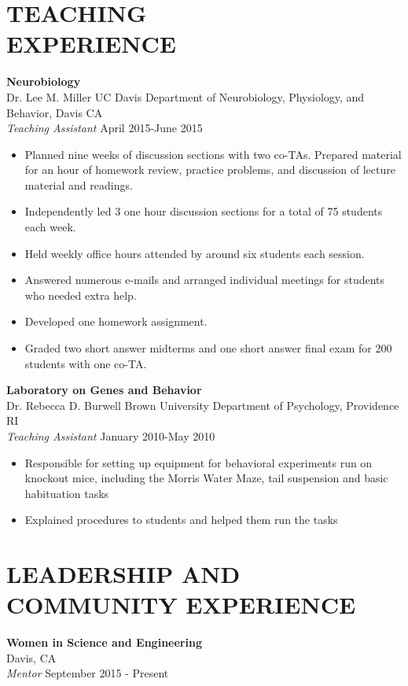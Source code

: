 \documentclass[line,margin,10pt]{res}
\begin{document}
\begin{resume}
 \section{TEACHING\\EXPERIENCE} 
 \textbf{Neurobiology}\\
 Dr. Lee M. Miller \hfill UC Davis Department of Neurobiology, Physiology, and Behavior, Davis CA\\
 {\sl Teaching Assistant} \hfill April 2015-June 2015
 \begin{itemize}\itemsep -2pt
 \item Planned nine weeks of discussion sections with two co-TAs. Prepared material for an hour of homework review, practice problems, and discussion of lecture material and readings.
 \item Independently led 3 one hour discussion sections for a total of 75 students each week.
 \item Held weekly office hours attended by around six students each session.
 \item Answered numerous e-mails and arranged individual meetings for students who needed extra help.
 \item Developed one homework assignment.
 \item Graded two short answer midterms and one short answer final exam for 200 students with one co-TA.
 \end{itemize}
 
 \textbf{Laboratory on Genes and Behavior}\\
 Dr. Rebecca D. Burwell \hfill Brown University Department of Psychology, Providence RI\\
 {\sl Teaching Assistant} \hfill January 2010-May 2010
\begin{itemize}\itemsep -2pt
\item Responsible for setting up equipment for behavioral experiments run on knockout mice, including the Morris Water Maze, tail suspension and basic habituation tasks
\item Explained procedures to students and helped them run the tasks
\end{itemize}
 

                   
 \section{LEADERSHIP AND\\ COMMUNITY EXPERIENCE}
\textbf{Women in Science and Engineering}\\
Davis, CA\\
{\sl Mentor} \hfill September 2015 - Present


\end{resume}
\end{document}

